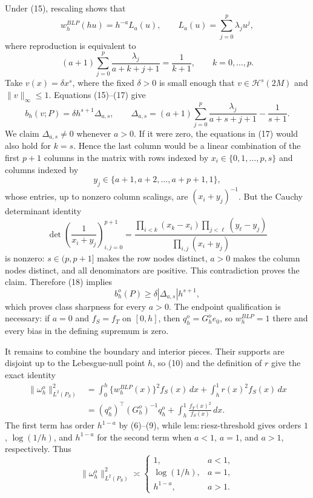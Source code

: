 Under (15), rescaling shows that
\[
w_h^{BLP}(hu)=h^{-a}L_a(u),
\qquad
L_a(u)=\sum_{j=0}^p\lambda_ju^j,
\tag{16}
\]
where reproduction is equivalent to
\[
(a+1)\sum_{j=0}^p\frac{\lambda_j}{a+k+j+1}=\frac1{k+1},
\qquad k=0,\ldots,p.
\tag{17}
\]
Take \(v(x)=\delta x^s\), where the fixed \(\delta>0\) is small enough that
\(v\in\mathcal H^s(2M)\) and \(\|v\|_\infty\le1\).  Equations (15)--(17) give
\[
b_h(v;P)=\delta h^{s+1}\Delta_{a,s},
\qquad
\Delta_{a,s}=(a+1)\sum_{j=0}^p\frac{\lambda_j}{a+s+j+1}-\frac1{s+1}.
\tag{18}
\]
We claim \(\Delta_{a,s}\ne0\) whenever \(a>0\).  If it were zero, the equations in (17) would also hold for \(k=s\).  Hence the last column would be a linear combination of the first \(p+1\) columns in the matrix with rows indexed by
\(x_i\in\{0,1,\ldots,p,s\}\) and columns indexed by
\[
y_j\in\{a+1,a+2,\ldots,a+p+1,1\},
\]
whose entries, up to nonzero column scalings, are \((x_i+y_j)^{-1}\).  But the Cauchy determinant identity
\[
\det\left(\frac1{x_i+y_j}\right)_{i,j=0}^{p+1}
=
\frac{\prod_{i<k}(x_k-x_i)\prod_{j<\ell}(y_\ell-y_j)}
{\prod_{i,j}(x_i+y_j)}
\tag{19}
\]
is nonzero: \(s\in(p,p+1]\) makes the row nodes distinct, \(a>0\) makes the column nodes distinct, and all denominators are positive.  This contradiction proves the claim.  Therefore (18) implies
\[
b_h^o(P)\ge\delta|\Delta_{a,s}|h^{s+1},
\tag{20}
\]
which proves class sharpness for every \(a>0\).  The endpoint qualification is necessary: if \(a=0\) and \(f_S=f_T\) on \([0,h]\), then \(q_h^o=G_h^oe_0\), so \(w_h^{BLP}=1\) there and every bias in the defining supremum is zero.

It remains to combine the boundary and interior pieces.  Their supports are disjoint up to the Lebesgue-null point \(h\), so (10) and the definition of \(r\) give the exact identity
\[
\begin{aligned}
\|\omega_h^o\|_{L^2(P_S)}^2
&=\int_0^h\{w_h^{BLP}(x)\}^2f_S(x)\,dx
  +\int_h^1r(x)^2f_S(x)\,dx\\
&=(q_h^o)^\top(G_h^o)^{-1}q_h^o
  +\int_h^1\frac{f_T(x)^2}{f_S(x)}\,dx.
\end{aligned}
\tag{21}
\]
The first term has order \(h^{1-a}\) by (6)--(9), while
\(\mathrm{lem:riesz\text{-}threshold}\) gives orders \(1\), \(\log(1/h)\), and
\(h^{1-a}\) for the second term when \(a<1\), \(a=1\), and \(a>1\), respectively.  Thus
\[
\|\omega_h^o\|_{L^2(P_S)}^2\asymp
\begin{cases}
1,&a<1,\\
\log(1/h),&a=1,\\
h^{1-a},&a>1.
\end{cases}
\tag{22}
\]

